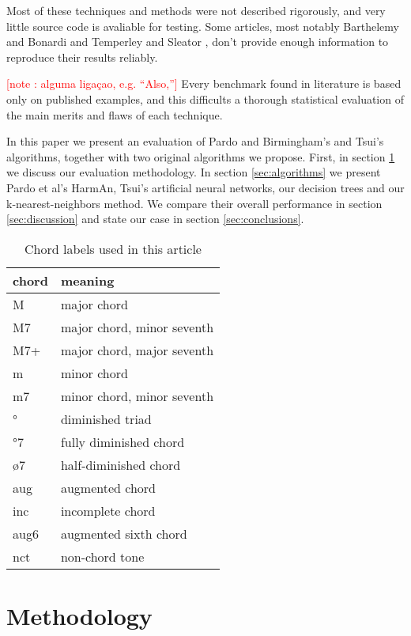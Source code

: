 \documentclass{article}
\newcounter{notecounter}
\newcommand{\note}[1]{
  \addtocounter{notecounter}{1}
  \textcolor{red}{[note \arabic{notecounter}: #1]}
}
\begin{document}
Most of these techniques and methods were not described rigorously,
and very little source code is avaliable for testing. Some articles,
most notably Barthelemy and Bonardi \cite{barthelemy.ea:figured} and
Temperley and Sleator \cite{temperley.ea:modeling}, don't provide
enough information to reproduce their results reliably. \note{alguma
  ligaçao, e.g. ``Also,''} Every
benchmark found in literature \cite{pardo.ea:automated,
  barthelemy.ea:figured, tsui:harmonic, taube:automatic,
  illescas.ea:harmonic} is based only on published examples, and this
difficults a thorough statistical evaluation of the main merits and
flaws of each technique.

In this paper we present an evaluation of Pardo and Birmingham's and
Tsui's algorithms, together with two original algorithms we propose.
First, in section \ref{sec:methodology} we discuss our evaluation
methodology. In section \ref{sec:algorithms} we present Pardo et al's
HarmAn, Tsui's artificial neural networks, our decision trees and our
k-nearest-neighbors method. We compare their overall performance in
section \ref{sec:discussion} and state our case in section
\ref{sec:conclusions}.

\begin{table}
\centering
\begin{tabular}{l|l}
chord & meaning \\ \hline
    M & major chord \\
   M7 & major chord, minor seventh \\
  M7+ & major chord, major seventh \\
    m & minor chord \\
   m7 & minor chord, minor seventh \\
    ° & diminished triad \\
   °7 & fully diminished chord \\
   ø7 & half-diminished chord \\
  aug & augmented chord \\
  inc & incomplete chord \\
 aug6 & augmented sixth chord \\
  nct & non-chord tone \\
\end{tabular}
\caption{Chord labels used in this article}
\label{tab:legenda}
\end{table}

\section{Methodology}
\label{sec:methodology}
\end{document}
